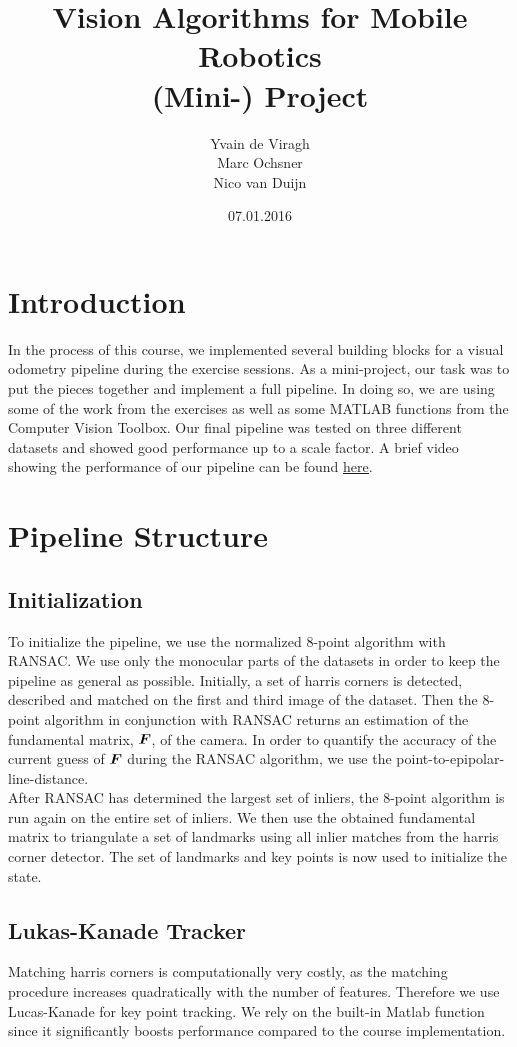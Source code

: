 \documentclass[11pt]{article}
\title{Vision Algorithms for Mobile Robotics\\ (Mini-) Project}
\author{Yvain de Viragh\\Marc Ochsner\\Nico van Duijn}
\date{07.01.2016}
\newcommand{\mat}{\matrixsym}
\begin{document}
\maketitle

\section{Introduction}
In the process of this course, we implemented several building blocks for a visual odometry pipeline during the exercise sessions. As a mini-project, our task was to put the pieces together and implement a full pipeline. In doing so, we are using some of the work from the exercises as well as some MATLAB functions from the Computer Vision Toolbox. Our final pipeline was tested on three different datasets and showed good performance up to a scale factor. A brief video showing the performance of our pipeline can be found \href{https://www.youtube.com/watch?v=7DpAWUQQgVU}{\underline{here}}.


\section{Pipeline Structure}
\subsection{Initialization}
To initialize the pipeline, we use the normalized 8-point algorithm with RANSAC. We use only the monocular parts of the datasets in order to keep the pipeline as general as possible. Initially, a set of harris corners is detected, described and matched on the first and third image of the dataset. Then the 8-point algorithm in conjunction with RANSAC returns an estimation of the fundamental matrix, $\mat{F}$, of the camera. In order to quantify the accuracy of the current guess of $\mat{F}$ during the RANSAC algorithm, we use the point-to-epipolar-line-distance.\\
After RANSAC has determined the largest set of inliers, the 8-point algorithm is run again on the entire set of inliers. We then use the obtained fundamental matrix to triangulate a set of landmarks using all inlier matches from the harris corner detector. The set of landmarks and key points is now used to initialize the state.

\subsection{Lukas-Kanade Tracker}
Matching harris corners is computationally very costly, as the matching procedure increases quadratically with the number of features. Therefore we use Lucas-Kanade for key point tracking. We rely on the built-in Matlab function since it significantly boosts performance compared to the course implementation.
\end{document}
